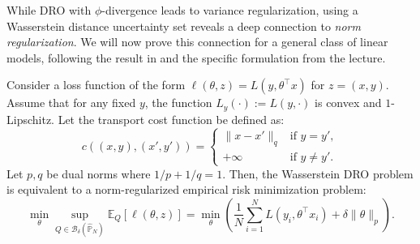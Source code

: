 \documentclass[12pt]{report}
\newcommand{\coloneqq}{\mathrel{:=}}
\begin{document}
While DRO with $\phi$-divergence leads to variance regularization, using a Wasserstein distance uncertainty set reveals a deep connection to \textit{norm regularization}. 
We will now prove this connection for a general class of linear models, following the result in \cite{shafieezadeh2019regularization} and the specific formulation from the lecture.

\begin{theorem}
Consider a loss function of the form $\ell(\theta, z) = L(y, \theta^\top x)$ for $z=(x,y)$. Assume that for any fixed $y$, the function $L_y(\cdot) \coloneqq L(y, \cdot)$ is convex and $1$-Lipschitz. 
Let the transport cost function be defined as:
\[
c((x,y), (x',y')) = 
\begin{cases}
    \|x - x'\|_q & \text{if } y=y', \\
    +\infty & \text{if } y \neq y'.
\end{cases}
\]
Let $p, q$ be dual norms where $1/p + 1/q = 1$. Then, the Wasserstein DRO problem is equivalent to a norm-regularized empirical risk minimization problem:
\[
\min_\theta \sup_{Q \in \mathcal{B}_\delta(\hat{\mathbb{P}}_N)} \mathbb{E}_Q[\ell(\theta, z)] = \min_\theta \left( \frac{1}{N}\sum_{i=1}^N L(y_i, \theta^\top x_i) + \delta \|\theta\|_p \right).
\]
\end{theorem}
\end{document}

